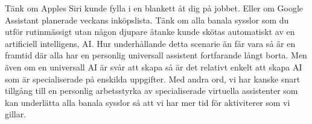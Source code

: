 \documentclass[a4paper,11pt, usenatbib]{article}
\begin{document}
 
Tänk om Apples Siri kunde fylla i en blankett åt dig på jobbet. Eller om Google Assistant planerade veckans inköpslista. Tänk om alla banala sysslor som du utför rutinmässigt utan någon djupare åtanke kunde skötas automatiskt av en artificiell intelligens, AI. Hur underhållande detta scenarie än får vara så är en framtid där alla har en personlig universall assistent fortfarande långt borta. Men även om en universall AI är svår att skapa så är det relativt enkelt att skapa AI som är specialiserade på enskilda uppgifter.  Med andra ord, vi har kanske snart tillgång till en personlig arbetsstyrka av specialiserade virtuella assistenter som kan underlätta alla banala sysslor så att vi har mer tid för aktiviterer som vi gillar. 
 
\end{document}
